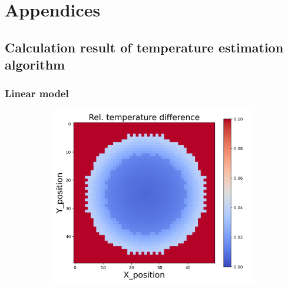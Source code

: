 \chapter{Appendices}%
{\linespread{0.8}
\section{Calculation result of temperature estimation algorithm}

\subsection{Linear model}
\begin{figure}[h]
    \centering
    \begin{minipage}{\textwidth}
        \centering
        \begin{subfigure}{0.28\textwidth}
            \centering
            \includegraphics[width=\textwidth]{figures/raw_data/0/linear/T_bias.jpg}
        \end{subfigure}
        \begin{subfigure}{0.28\textwidth}
            \centering

\end{subfigure}
\end{minipage}
\end{figure}}
